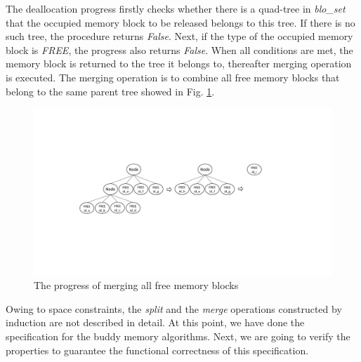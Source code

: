 The deallocation progress firstly checks whether there is a quad-tree in \emph{blo\_set} that the occupied memory block to be released belongs to this tree. If there is no such tree, the procedure returns \emph{False}. Next, if the type of the occupied memory block is \emph{FREE}, the progress also returns \emph{False}. When all conditions are met, the memory block is returned to the tree it belongs to, thereafter merging operation is executed. The merging operation is to combine all free memory blocks that belong to the same parent tree showed in Fig. \ref{fig2}.

\begin{figure}
	\centering
	\includegraphics[width=1\textwidth]{fig2.pdf}
	\caption{The progress of merging all free memory blocks}
	\label{fig2}
\end{figure}

Owing to space constraints, the \emph{split} and the \emph{merge} operations constructed by induction are not described in detail. At this point, we have done the specification for the buddy memory algorithms. Next, we are going to verify the properties to guarantee the functional correctness of this specification.